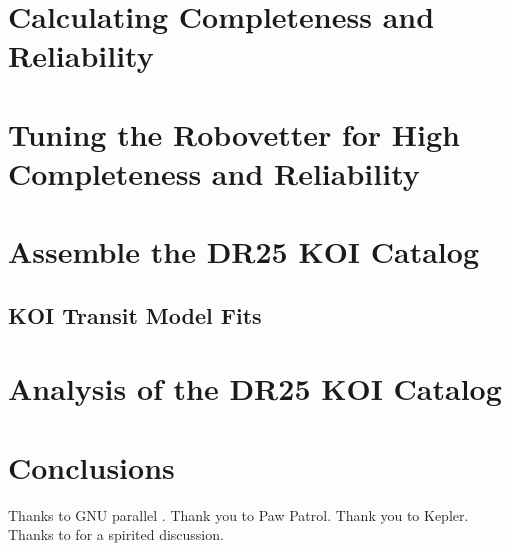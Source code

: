 \documentclass[apj,twocolappendix,numberedappendix]{emulateapj}
\renewcommand{\_}{\discretionary{\underscore}{}{\underscore}}  %
\begin{document}
\section{Calculating Completeness and Reliability}


\section{Tuning the Robovetter for High Completeness and Reliability}



\section{Assemble the DR25 KOI Catalog}


\subsection{KOI Transit Model Fits}


\section{Analysis of the DR25 KOI Catalog}













\section{Conclusions}

\acknowledgments
Thanks to GNU parallel \citep{Tange2011a}.
Thank you to Paw Patrol.
Thank you to Kepler.
Thanks to \citet{Turbo-King2017} for a spirited discussion.




%



\clearpage
\appendix





\clearpage
\tableofcontents
\end{document}
